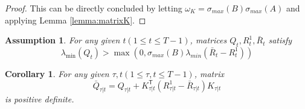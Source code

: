 \documentclass{article}
\newcommand{\transpose}{\mathsf{T}}
\newtheorem{assumption}{Assumption}
\newtheorem{corollary}{Corollary}
\begin{document}
\begin{proof}
    This can be directly concluded by letting $\omega_{K} = \sigma_{max}(B)\sigma_{max}(A)$ and applying Lemma \ref{lemma:matrixK}.
\end{proof}

\begin{assumption}\label{assumption:lowerQ}
    For any given $t(1\leq t \leq T-1)$, matrices $Q_{t}, R_{t}^{1}, \bar{R}_{t}$ satisfy
    \begin{equation}
        \lambda_{\min}(Q_{t}) > \max(0,\sigma_{max}(B)\lambda_{min}(\bar{R}_{t}-R_{t}^{1}))
    \end{equation}
\end{assumption}

\begin{corollary}
    For any given $\tau,t(1\leq \tau, t \leq T-1)$, matrix
    \begin{equation}
        \bar{Q}_{\tau|t} = Q_{\tau|t} + K_{\tau|t}^{\transpose}(R_{\tau|t}^{1} - \bar{R}_{\tau|t})K_{\tau|t}
    \end{equation}
    is positive definite.
\end{corollary}
\end{document}

